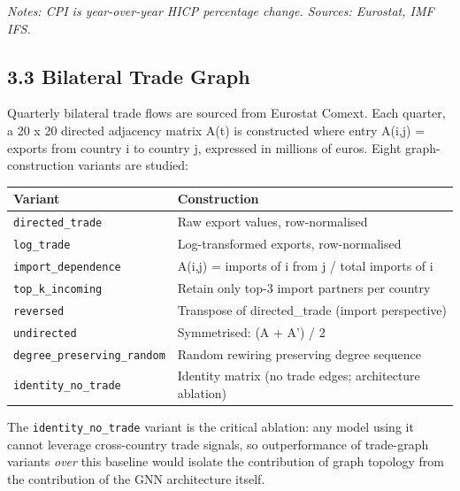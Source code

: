 \documentclass[
  11pt,
  a4paper]{article}
\newcounter{none} %
\begin{document}
\emph{Notes: CPI is year-over-year HICP percentage change. Sources:
Eurostat, IMF IFS.}

\subsection{3.3 Bilateral Trade Graph}\label{bilateral-trade-graph}

Quarterly bilateral trade flows are sourced from Eurostat Comext. Each
quarter, a 20 x 20 directed adjacency matrix A(t) is constructed where
entry A(i,j) = exports from country i to country j, expressed in
millions of euros. Eight graph-construction variants are studied:

{\def\LTcaptype{none} %
\begin{longtable}[]{@{}
  >{\raggedright\arraybackslash}p{}
  >{\raggedright\arraybackslash}p{}@{}}
\toprule\noalign{}
\begin{minipage}[b]{\linewidth}\raggedright
Variant
\end{minipage} & \begin{minipage}[b]{\linewidth}\raggedright
Construction
\end{minipage} \\
\midrule\noalign{}
\endhead
\bottomrule\noalign{}
\endlastfoot
\texttt{directed\_trade} & Raw export values, row-normalised \\
\texttt{log\_trade} & Log-transformed exports, row-normalised \\
\texttt{import\_dependence} & A(i,j) = imports of i from j / total
imports of i \\
\texttt{top\_k\_incoming} & Retain only top-3 import partners per
country \\
\texttt{reversed} & Transpose of directed\_trade (import perspective) \\
\texttt{undirected} & Symmetrised: (A + A') / 2 \\
\texttt{degree\_preserving\_random} & Random rewiring preserving degree
sequence \\
\texttt{identity\_no\_trade} & Identity matrix (no trade edges;
architecture ablation) \\
\end{longtable}
}

The \texttt{identity\_no\_trade} variant is the critical ablation: any
model using it cannot leverage cross-country trade signals, so
outperformance of trade-graph variants \emph{over} this baseline would
isolate the contribution of graph topology from the contribution of the
GNN architecture itself.
\end{document}

